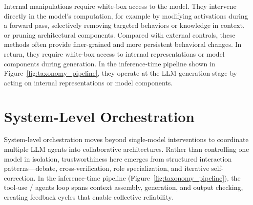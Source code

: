 \documentclass[acmsmall]{acmart}
\begin{document}

\label{sec:internal_manipulations}
Internal manipulations require white-box access to the model. They intervene directly in the model's computation, for example by modifying activations during a forward pass, selectively removing targeted behaviors or knowledge in context, or pruning architectural components. Compared with external controls, these methods often provide finer-grained and more persistent behavioral changes. In return, they require white-box access to internal representations or model components during generation. In the inference-time pipeline shown in Figure~\ref{fig:taxonomy_pipeline}, they operate at the LLM generation stage by acting on internal representations or model components.


% 



\section{System-Level Orchestration}
\label{sec:system_level}
System-level orchestration moves beyond single-model interventions to coordinate multiple LLM agents into collaborative architectures. Rather than controlling one model in isolation, trustworthiness here emerges from structured interaction patterns---debate, cross-verification, role specialization, and iterative self-correction. In the inference-time pipeline (Figure~\ref{fig:taxonomy_pipeline}), the tool-use / agents loop spans context assembly, generation, and output checking, creating feedback cycles that enable collective reliability.












\appendix
% 
\end{document}
